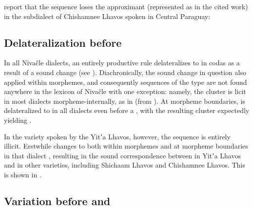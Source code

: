\citet[50]{LC20} report that the sequence  loses the approximant  (represented as  in the cited work) in the subdialect of Chishamnee Lhavos spoken in Central Paraguay:

\ea
    \begin{xlist}
        \ex {} \recind {}
        \ex {} \recind {}
    \end{xlist}
\z
{}

\subsection{Delateralization before }\label{ni-kl-glottal}

In all Nivaĉle dialects, an entirely productive rule delateralizes  to  in codas as a result of a sound change (see ). Diachronically, the sound change in question also applied within morphemes, and consequently sequences of the type  are not found anywhere in the lexicon of Nivaĉle with one exception: namely, the cluster  is licit in most dialects morpheme-internally, as in  (from ). At morpheme boundaries,  is delateralized to  in all dialects even before a , with the resulting cluster  expectedly yielding .

In the variety spoken by the Yitʼa Lhavos, however, the sequence  is entirely illicit. Erstwhile  changes to  both within morphemes and at morpheme boundaries in that dialect \citep[7, 227--228]{AnG15}, resulting in the sound correspondence between  in Yitʼa Lhavos and  in other varieties, including Shichaam Lhavos and Chishamnee Lhavos. This is shown in  \citep[227--228]{AnG15}.

\ea\label{Ni-kl-glottal-merger}
    \begin{xlist}
        \ex {} \recind {}
        \ex {} \recind {}
        \ex {} \recind {}
    \end{xlist}
\z
{}

\subsection{Variation before  and }\label{ni-sc-shc}

